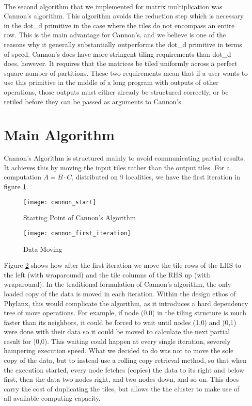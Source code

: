 \label{chap:cannon}
\paragraph{}
The second algorithm that we implemented for matrix multiplication was Cannon's algorithm. This algorithm avoids the reduction step which is necessary in the dot\_d primitive in the case where the tiles do not encompass an entire row. This is the main advantage for Cannon's, and we believe is one of the reasons why it generally substantially outperforms the dot\_d primitive in terms of speed. Cannon's does have more stringent tiling requirements than dot\_d does, however. It requires that the matrices be tiled uniformly across a perfect square number of partitions. These two requirements mean that if a user wants to use this primitive in the middle of a long program with outputs of other operations, those outputs must either already be structured correctly, or be retiled before they can be passed as arguments to Cannon's. 
\section{Main Algorithm}
Cannon's Algorithm is structured mainly to avoid communicating partial results. It achieves this by moving the input tiles rather than the output tiles. For a computation $A=B \cdot C$, distributed on 9 localities, we have the first iteration in figure \ref{Fig_8}. 

\begin{figure}
	\centering
	\texttt{[image: cannon\_start]}
	\caption{Starting Point of Cannon's Algorithm}
	\label{Fig_8}
\end{figure}

\begin{figure}
	\centering
	\texttt{[image: cannon\_first\_iteration]}
	\caption{Data Moving}
	\label{Fig_9}
\end{figure}

Figure \ref{Fig_9} shows how after the first iteration we move the tile rows of the LHS to the left (with wraparound) and the tile columns of the RHS up (with wraparound). In the traditional formulation of Cannon's algorithm, the only loaded copy of the data is moved in each iteration. Within the design ethos of Phylanx, this would complicate the algorithm, as it introduces a hard dependency tree of move operations. For example, if node (0,0) in the tiling structure is much faster than its neighbors, it could be forced to wait until nodes (1,0) and (0,1) were done with their data so it could be moved to calculate the next partial result for (0,0). This waiting could happen at every single iteration, severely hampering execution speed. What we decided to do was not to move the sole copy of the data, but to instead use a rolling copy retrieval method, so that when the execution started, every node fetches (copies) the data to its right and below first, then the data two nodes right, and two nodes down, and so on. This does carry the cost of duplicating the tiles, but allows the the cluster to make use of all available computing capacity. 
